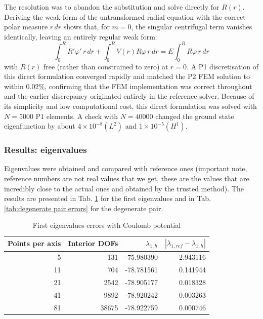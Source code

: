 \documentclass[conference]{IEEEtran}
\begin{document}
The resolution was to abandon the substitution and solve directly for $R(r)$. Deriving the weak form of the untransformed radial equation with the correct polar measure $r \, dr$ shows that, for $m = 0$, the singular centrifugal term vanishes identically, leaving an entirely regular weak form:
\begin{equation}
    \int_0^R R'\varphi'\, r\,dr + \int_0^R V(r)R\varphi\, r\,dr = E \int_0^R R\varphi\, r\,dr
\end{equation}
with $R(r)$ free (rather than constrained to zero) at $r = 0$. A P1 discretisation of this direct formulation converged rapidly and matched the P2 FEM solution to within $0.02\%$, confirming that the FEM implementation was correct throughout and the earlier discrepancy originated entirely in the reference solver. Because of its simplicity and low computational cost, this direct formulation was solved with $N = 5000$ P1 elements. A check with $N = 40000$ changed the ground state eigenfunction by about $4 \times 10^{-8} (L^2)$ and $1 \times 10^{-5} (H^1)$.


\subsubsection{Results: eigenvalues}
Eigenvalues were obtained and compared with reference ones (important note, reference numbers are not real values that we get, these are the values that are incredibly close to the actual ones and obtained by the trusted method). The results are presented in Tab. \ref{tab:first eigvals errors} for the first eigenvalues and in Tab. \ref{tab:degenerate pair errors} for the degenerate pair.
\begin{table}[H]
    \centering
    \caption{First eigenvalues errors with Coulomb potential}
    \label{tab:first eigvals errors}
    \begin{tabular}{rrrr}
        \toprule
        Points per axis & Interior DOFs & $\lambda_{1,h}$ & $|\lambda_{1,ref} - \lambda_{1,h}|$ \\
        \midrule
        5 & 131 & -75.980390 & 2.943116 \\
        11 & 704 & -78.781561 & 0.141944 \\
        21 & 2542 & -78.905177 & 0.018328 \\
        41 & 9892 & -78.920242 & 0.003263 \\
        81 & 38675 & -78.922759 & 0.000746 \\
        \bottomrule
    \end{tabular}
\end{table}
\end{document}
